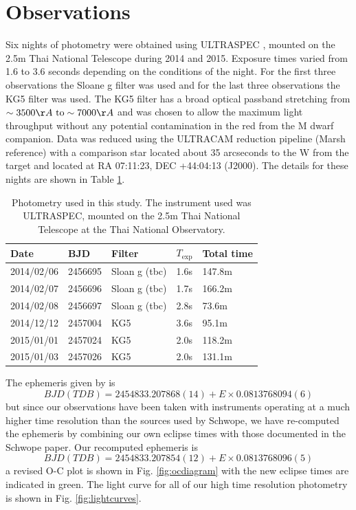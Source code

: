 \documentclass[a4paper,fleqn,usenatbib]{mnras}
\begin{document}
\section{Observations}
Six nights of photometry were obtained using ULTRASPEC \citep{ULTRASPEC}, mounted on the 2.5m Thai National Telescope during 2014 and 2015. Exposure times varied from 1.6 to 3.6 seconds depending on the conditions of the night. For the first three observations the Sloane g filter was used and for the last three observations the KG5 filter was used. The KG5 filter has a broad optical passband stretching from $\sim3500 \AA~ \mbox{to} \sim7000 \AA$ and was chosen to allow the maximum light throughput without any potential contamination in the red from the M dwarf companion.  Data was reduced using the ULTRACAM reduction pipeline (Marsh reference) with a comparison star located about 35 arcseconds to the W from the target and located at RA 07:11:23, DEC +44:04:13 (J2000). The details for these nights are shown in Table \ref{tab:photometry}. 

\begin{table}
  \caption{Photometry used in this study. The instrument used was ULTRASPEC, mounted on the 2.5m Thai National Telescope at the Thai National Observatory.}
  \begin{tabular}{ l  l  l  l  l  }
  \hline
  Date & BJD & Filter & $T_{\mbox{exp}}$& Total time \\
  \hline
    2014/02/06 & 2456695 & Sloan g (tbc)& 1.6s & 147.8m \\
    2014/02/07 & 2456696 & Sloan g (tbc)& 1.7s & 166.2m \\
    2014/02/08 & 2456697 & Sloan g (tbc)& 2.8s & 73.6m \\
    2014/12/12 & 2457004 & KG5 & 3.6s & 95.1m \\
    2015/01/01 & 2457024 & KG5 & 2.0s & 118.2m \\
    2015/01/03 & 2457026 & KG5 & 2.0s & 131.1m \\
    
  \hline
  \end{tabular}
  \label{tab:photometry}
\end{table}

The ephemeris given by \citet{Schwope2015} is 
\begin{equation}BJD(TDB) = 2454833.207868(14) + E\times0.0813768094(6)\end{equation}
but since our observations have been taken with instruments operating at a much higher time resolution than the sources used by Schwope, we have re-computed the ephemeris by combining our own eclipse times with those documented in the Schwope paper. Our recomputed ephemeris is 
\begin{equation}BJD(TDB) = 2454833.207854(12) + E\times0.0813768096(5)\end{equation}
a revised O-C plot is shown in Fig. \ref{fig:ocdiagram} with the new eclipse times are indicated in green. The light curve for all of our high time resolution photometry is shown in Fig. \ref{fig:lightcurves}.
\end{document}
